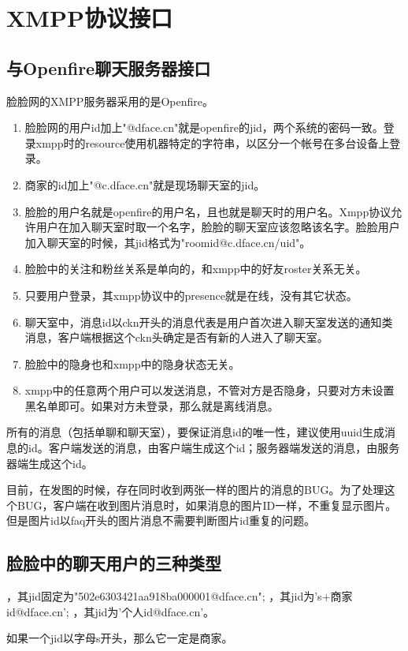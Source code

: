 \section{XMPP协议接口}


\subsection{与Openfire聊天服务器接口}
脸脸网的XMPP服务器采用的是Openfire。

\begin{enumerate}
\item 脸脸网的用户id加上"@dface.cn"就是openfire的jid，两个系统的密码一致。登录xmpp时的resource使用机器特定的字符串，以区分一个帐号在多台设备上登录。
\item 商家的id加上"@c.dface.cn"就是现场聊天室的jid。
\item 脸脸的用户名就是openfire的用户名，且也就是聊天时的用户名。Xmpp协议允许用户在加入聊天室时取一个名字，脸脸的聊天室应该忽略该名字。脸脸用户加入聊天室的时候，其jid格式为"roomid@c.dface.cn/uid"。
\item 脸脸中的关注和粉丝关系是单向的，和xmpp中的好友roster关系无关。
\item 只要用户登录，其xmpp协议中的presence就是在线，没有其它状态。
\item 聊天室中，消息id以ckn开头的消息代表是用户首次进入聊天室发送的通知类消息，客户端根据这个ckn头确定是否有新的人进入了聊天室。
\item 脸脸中的隐身也和xmpp中的隐身状态无关。
\item xmpp中的任意两个用户可以发送消息，不管对方是否隐身，只要对方未设置黑名单即可。如果对方未登录，那么就是离线消息。
\end{enumerate}

所有的消息（包括单聊和聊天室），要保证消息id的唯一性，建议使用uuid生成消息的id。客户端发送的消息，由客户端生成这个id；服务器端发送的消息，由服务器端生成这个id。

目前，在发图的时候，存在同时收到两张一样的图片的消息的BUG。为了处理这个BUG，客户端在收到图片消息时，如果消息的图片ID一样，不重复显示图片。但是图片id以faq开头的图片消息不需要判断图片id重复的问题。



\subsection{脸脸中的聊天用户的三种类型}

\begin{enumerate}
，其jid固定为"502e6303421aa918ba000001@dface.cn";
，其jid为's+商家id@dface.cn';
，其jid为'个人id@dface.cn'。
\end{enumerate}
如果一个jid以字母s开头，那么它一定是商家。


